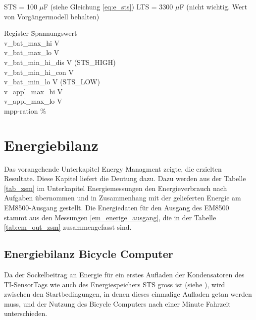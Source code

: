 
STS = 100 $\mu$F        (siehe Gleichung \ref{eq:e_sts})
LTS = 3300 $\mu$F       (nicht wichtig. Wert von Vorgängermodell behalten)

\begin{minipage}{\textwidth}
    \begin{tabbing}
        Register \quad\= Spannungswert \\[0.8ex]
        v\_bat\_max\_hi        V \\
        v\_bat\_max\_lo        V \\
        v\_bat\_min\_hi\_dis   V  (STS\_HIGH)\\
        v\_bat\_min\_hi\_con   V \\
        v\_bat\_min\_lo        V (STS\_LOW)\\
        v\_appl\_max\_hi       V \\
        v\_appl\_max\_lo       V \\   
        mpp-ration            \thinspace\%
    \end{tabbing}
\end{minipage}  



\section{Energiebilanz}

Das vorangehende Unterkapitel Energy Managment zeigte, die erzielten Resultate. Diese Kapitel liefert die Deutung dazu. Dazu werden aus der Tabelle \ref{tab_zsm} im Unterkapitel Energiemessungen den Energieverbrauch nach Aufgaben übernommen und in Zusammenhang mit der gelieferten Energie am EM8500-Ausgang gestellt. Die Energiedaten für den Ausgang des EM8500 stammt aus den Messungen \ref{em_enerige_ausgang}, die in der Tabelle \ref{tab:em_out_zsm} zusammengefasst sind.

\subsection{Energiebilanz Bicycle Computer}

Da der Sockelbeitrag an Energie für ein erstes Aufladen der Kondensatoren des TI-SensorTags wie auch des Energiespeichers STS gross ist (siehe ), wird zwischen den Startbedingungen, in denen dieses einmalige Aufladen getan werden muss, und der Nutzung des Bicycle Computers nach einer Minute Fahrzeit unterschieden.



